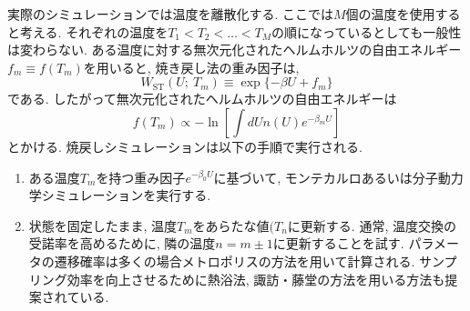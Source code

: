 実際のシミュレーションでは温度を離散化する. 
ここでは$M$個の温度を使用すると考える. 
それぞれの温度を$T_{1} < T_{2} < \ldots < T_{M}$の順になっているとしても一般性は変わらない. 
ある温度に対する無次元化されたヘルムホルツの自由エネルギー$f_{m} \equiv f(T_{m})$を用いると, 焼き戻し法の重み因子は, 
\begin{equation}
  W_{\mathrm{ST}}(U;~T_{m}) \equiv \exp\{-\beta U + f_{m}\}
\end{equation}
である. したがって無次元化されたヘルムホルツの自由エネルギーは
\begin{equation}
  f(T_{m}) \propto
  - \ln\left[\int dU n(U) e^{-\beta_{m} U}\right]
\end{equation}
とかける. 
焼戻しシミュレーションは以下の手順で実行される.
\begin{enumerate}
 \item ある温度$T_{m}$を持つ重み因子$e^{-\beta_{0} U}$に基づいて, モンテカルロあるいは分子動力学シミュレーションを実行する. 
 \item 状態を固定したまま,  温度$T_{m}$をあらたな値$(T_{n}$に更新する. 通常, 温度交換の受諾率を高めるために, 隣の温度$n = m \pm 1$に更新することを試す. パラメータの遷移確率は多くの場合メトロポリスの方法を用いて計算される. サンプリング効率を向上させるために熱浴法, 諏訪・藤堂の方法を用いる方法も提案されている.
\end{enumerate}

